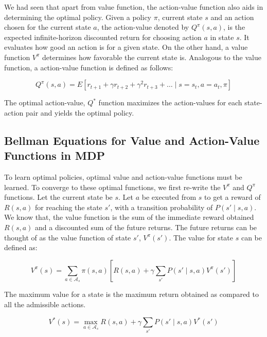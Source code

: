 We had seen that apart from value function, the action-value function also aids in determining the optimal policy. Given a policy \(\pi\), current state \(s\) and an action chosen for the current state \(a\), the action-value denoted by \(Q^\pi (s,a)\), is the expected infinite-horizon discounted return for choosing action \(a\) in state \(s\). It evaluates how good an action is for a given state. On the other hand, a value function \(V^\pi\) determines how favorable the current state is. Analogous to the value function, a action-value function is defined as follows:

\begin{equation}
    Q^\pi (s, a)=E[r_{t+1}+\gamma r_{t+2}+ \gamma^2 r_{t+3} + \dots \mid s=s_t, a=a_t, \pi]
\end{equation}

The optimal action-value, \(Q^*\) function maximizes the action-values for each state-action pair and yields the optimal policy. 

\subsection{Bellman Equations for Value and Action-Value Functions in MDP}

To learn optimal policies, optimal value and action-value functions must be learned. To converge to these optimal functions, we first re-write the \(V^\pi\) and \(Q^\pi\) functions. Let the current state be \(s\). Let \(a\) be executed from \(s\) to get a reward of \(R(s,a)\) for reaching the state \(s'\), with a transition probability of \(P(s' \mid s,a)\). We know that, the value function is the sum of the immediate reward obtained \(R(s,a)\) and a discounted sum of the future returns. The future returns can be thought of as the value function of state \(s'\), \(V^\pi (s')\).  The value for state \(s\) can be defined as:

\begin{equation}
    V^\pi (s)=\sum_{a \in \mathcal{A}_s} \pi(s,a)[R(s,a)  + \gamma \sum_{s'} P(s'\mid s,a) V^\pi (s')]
\end{equation}

The maximum value for a state is the maximum return obtained as compared to all the admissible actions. 


\begin{equation}
    V^* (s)=   \max_{a \in \mathcal{A}_s } ⁡R(s,a)  + \gamma \sum_{s'} P(s' \mid s,a) V^* (s')
\end{equation}

